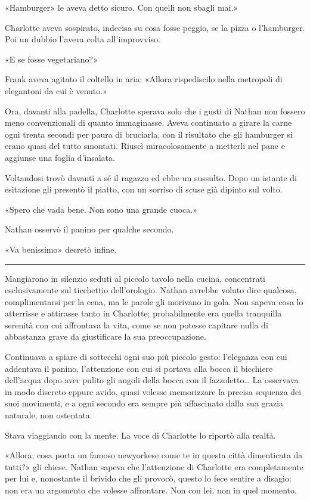 \documentclass[a4paper,oneside,11pt]{memoir}
\begin{document}
«Hamburger» le aveva detto sicuro. Con quelli non sbagli mai.»

Charlotte aveva sospirato, indecisa su cosa fosse peggio, se la pizza o
l'hamburger. Poi un dubbio l'aveva colta all'improvviso.

«E se fosse vegetariano?»

Frank aveva agitato il coltello in aria: «Allora rispediscilo nella metropoli di
elegantoni da cui è venuto.»

Ora, davanti alla padella, Charlotte sperava solo che i gusti di Nathan non
fossero meno convenzionali di quanto immaginasse. Aveva continuato a girare la
carne ogni trenta secondi per paura di bruciarla, con il risultato che gli
hamburger si erano quasi del tutto smontati. Riuscì miracolosamente a metterli
nel pane e aggiunse una foglia d'insalata.

Voltandosi trovò davanti a sé il ragazzo ed ebbe un sussulto. Dopo un istante di
esitazione gli presentò il piatto, con un sorriso di scuse già dipinto sul
volto.

«Spero che vada bene. Non sono una grande cuoca.»

Nathan osservò il panino per qualche secondo.

«Va benissimo» decretò infine.

\plainbreak{1}

Mangiarono in silenzio seduti al piccolo tavolo nella cucina, concentrati
esclusivamente sul ticchettio dell'orologio. Nathan avrebbe voluto dire
qualcosa, complimentarsi per la cena, ma le parole gli morivano in gola. Non
sapeva cosa lo atterrisse e attirasse tanto in Charlotte; probabilmente era
quella tranquilla serenità con cui affrontava la vita, come se non potesse
capitare nulla di abbastanza grave da giustificare la sua preoccupazione.

Continuava a spiare di sottecchi ogni suo più piccolo gesto: l'eleganza con cui
addentava il panino, l'attenzione con cui si portava alla bocca il bicchiere
dell'acqua dopo aver pulito gli angoli della bocca con il fazzoletto\dots{} La
osservava in modo discreto eppure avido, quasi volesse memorizzare la precisa
sequenza dei suoi movimenti, e a ogni secondo era sempre più affascinato dalla
sua grazia naturale, non ostentata.

Stava viaggiando con la mente. La voce di Charlotte lo riportò alla realtà.

«Allora, cosa porta un famoso newyorkese come te in questa città dimenticata da
tutti?» gli chiese. Nathan sapeva che l'attenzione di Charlotte era
completamente per lui e, nonostante il brivido che gli provocò, questo lo fece
sentire a disagio: non era un argomento che volesse affrontare. Non con lei, non
in quel momento.
\end{document}
